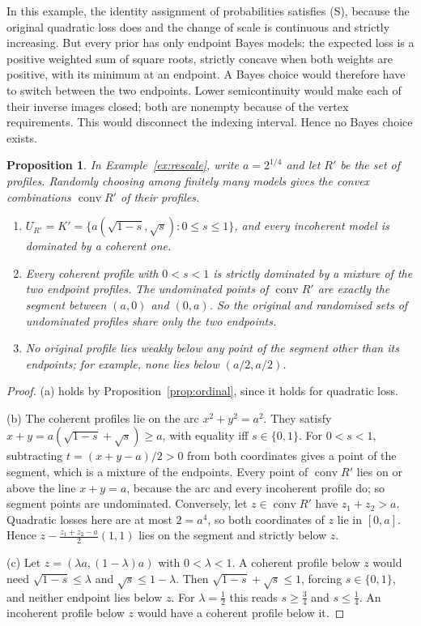 \documentclass[11pt]{article}
\newtheorem{proposition}[theorem]{Proposition}
\theoremstyle{definition}
\theoremstyle{remark}
\newcommand{\co}{\operatorname{conv}}
\begin{document}
In this example, the identity assignment of probabilities satisfies (S), because the original quadratic loss does and the change of scale is continuous and strictly increasing. But every prior has only endpoint Bayes models: the expected loss is a positive weighted sum of square roots, strictly concave when both weights are positive, with its minimum at an endpoint. A Bayes choice would therefore have to switch between the two endpoints. Lower semicontinuity would make each of their inverse images closed; both are nonempty because of the vertex requirements. This would disconnect the indexing interval. Hence no Bayes choice exists.\label{rem:bayeschoice}

\label{sec:random}
\begin{proposition}\label{prop:random}
In Example~\ref{ex:rescale}, write $a=2^{1/4}$ and let $R'$ be the set of profiles. Randomly choosing among finitely many models gives the convex combinations $\co R'$ of their profiles.
\begin{enumerate}[label=(\alph*)]
\item $U_{R'}=K'=\{a(\sqrt{1-s},\sqrt s):0\le s\le1\}$, and every incoherent model is dominated by a coherent one.
\item Every coherent profile with $0<s<1$ is strictly dominated by a mixture of the two endpoint profiles. The undominated points of $\co R'$ are exactly the segment between $(a,0)$ and $(0,a)$. So the original and randomised sets of undominated profiles share only the two endpoints.
\item No original profile lies weakly below any point of the segment other than its endpoints; for example, none lies below $(a/2,a/2)$.
\end{enumerate}
\end{proposition}
\begin{proof}
(a) holds by Proposition~\ref{prop:ordinal}, since it holds for quadratic loss.

(b) The coherent profiles lie on the arc $x^2+y^2=a^2$. They satisfy $x+y=a(\sqrt{1-s}+\sqrt s)\ge a$, with equality iff $s\in\{0,1\}$. For $0<s<1$, subtracting $t=(x+y-a)/2>0$ from both coordinates gives a point of the segment, which is a mixture of the endpoints. Every point of $\co R'$ lies on or above the line $x+y=a$, because the arc and every incoherent profile do; so segment points are undominated. Conversely, let $z\in\co R'$ have $z_1+z_2>a$. Quadratic losses here are at most $2=a^4$, so both coordinates of $z$ lie in $[0,a]$. Hence $z-\tfrac{z_1+z_2-a}2(1,1)$ lies on the segment and strictly below $z$.

(c) Let $z=(\lambda a,(1-\lambda)a)$ with $0<\lambda<1$. A coherent profile below $z$ would need $\sqrt{1-s}\le\lambda$ and $\sqrt s\le1-\lambda$. Then $\sqrt{1-s}+\sqrt s\le1$, forcing $s\in\{0,1\}$, and neither endpoint lies below $z$. For $\lambda=\tfrac12$ this reads $s\ge\tfrac34$ and $s\le\tfrac14$. An incoherent profile below $z$ would have a coherent profile below it.
\end{proof}
\end{document}
